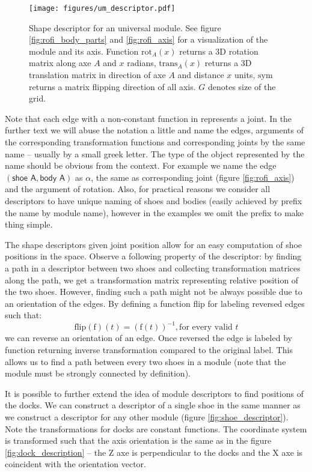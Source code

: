 \begin{figure}[h!]
    \centering
    \texttt{[image: figures/um\_descriptor.pdf]}
    \caption{Shape descriptor for an universal module. See figure
    \ref{fig:rofi_body_parts} and \ref{fig:rofi_axis} for a visualization of the
    module and its axis. Function $\text{rot}_A(x)$ returns a 3D rotation matrix
    along axe $A$ and $x$ radians, $\text{trans}_A(x)$ returns a 3D translation
    matrix in direction of axe $A$ and distance $x$ units, $\text{sym}$ returns
    a matrix flipping direction of all axis. $G$ denotes size of the grid.}
    \label{fig:um_descriptor}
\end{figure}

Note that each edge with a non-constant function in represents a joint. In the
further text we will abuse the notation a little and name the edges, arguments
of the corresponding transformation functions and corresponding joints by the
same name -- usually by a small greek letter. The type of the object represented
by the name should be obvious from the context. For example we name the edge
$(\textsf{shoe A}, \textsf{body A})$ as $\alpha$, the same as corresponding
joint (figure \ref{fig:rofi_axis}) and the argument of rotation. Also, for
practical reasons we consider all descriptors to have unique naming of shoes and
bodies (easily achieved by prefix the name by module name), however in the
examples we omit the prefix to make thing simple.

The shape descriptors given joint position allow for an easy computation of shoe
positions in the space. Observe a following property of the descriptor: by
finding a path in a descriptor between two shoes and collecting transformation
matrices along the path, we get a transformation matrix representing relative
position of the two shoes. However, finding such a path might not be always
possible due to an orientation of the edges. By defining a function flip for
labeling reversed edges such that:
\[\text{flip}(\text{f})(t) = (\text{f}(t))^{-1}, \text{for every valid } t\] we
can reverse an orientation of an edge. Once reversed the edge is labeled by
function returning inverse transformation compared to the original label. This
allows us to find a path between every two shoes in a module (note that the
module must be strongly connected by definition).

It is possible to  further extend the idea of module descriptors to find
positions of the docks.  We can construct a descriptor of a single shoe in the
same manner as we construct a descriptor for any other module (figure
\ref{fig:shoe_descriptor}). Note the transformations for docks are constant
functions. The coordinate system is transformed such that the axis orientation
is the same as in the figure \ref{fig:dock_description} -- the Z axe is
perpendicular to the docks and the X axe is coincident with the orientation
vector.

